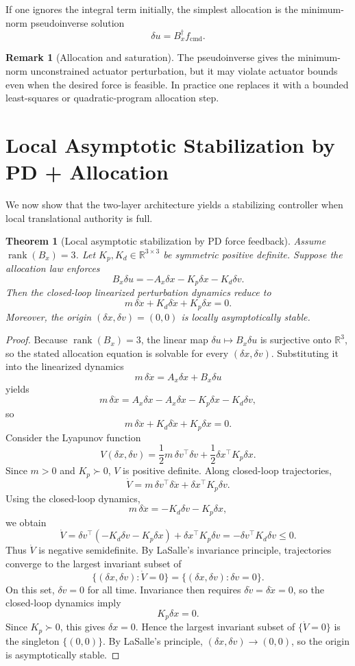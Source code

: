 \documentclass[11pt]{article}
\newtheorem{theorem}{Theorem}
\theoremstyle{definition}
\newtheorem{remark}{Remark}
\begin{document}
If one ignores the integral term initially, the simplest allocation is the minimum-norm pseudoinverse solution
\[
\delta u = B_x^\dagger f_{\mathrm{cmd}}.
\]

\begin{remark}[Allocation and saturation]
The pseudoinverse gives the minimum-norm unconstrained actuator perturbation, but it may violate actuator bounds even when the desired force is feasible. In practice one replaces it with a bounded least-squares or quadratic-program allocation step.
\end{remark}

\section{Local Asymptotic Stabilization by PD + Allocation}

We now show that the two-layer architecture yields a stabilizing controller when local translational authority is full.

\begin{theorem}[Local asymptotic stabilization by PD force feedback]
Assume $\operatorname{rank}(B_x)=3$. Let $K_p,K_d\in\mathbb{R}^{3\times 3}$ be symmetric positive definite. Suppose the allocation law enforces
\[
B_x\delta u = -A_x\delta x - K_p\delta x - K_d\delta v.
\]
Then the closed-loop linearized perturbation dynamics reduce to
\[
m\,\delta \ddot x + K_d\delta \dot x + K_p\delta x = 0.
\]
Moreover, the origin $(\delta x,\delta v)=(0,0)$ is locally asymptotically stable.
\end{theorem}

\begin{proof}
Because $\operatorname{rank}(B_x)=3$, the linear map $\delta u\mapsto B_x\delta u$ is surjective onto $\mathbb{R}^3$, so the stated allocation equation is solvable for every $(\delta x,\delta v)$. Substituting it into the linearized dynamics
\[
m\,\delta \ddot x = A_x\delta x + B_x\delta u
\]
yields
\[
m\,\delta \ddot x = A_x\delta x - A_x\delta x - K_p\delta x - K_d\delta v,
\]
so
\[
m\,\delta \ddot x + K_d\delta \dot x + K_p\delta x = 0.
\]
Consider the Lyapunov function
\[
V(\delta x,\delta v)=\frac12 m\,\delta v^\top\delta v + \frac12\delta x^\top K_p\delta x.
\]
Since $m>0$ and $K_p\succ 0$, $V$ is positive definite. Along closed-loop trajectories,
\[
\dot V = m\,\delta v^\top\delta \ddot x + \delta x^\top K_p\delta v.
\]
Using the closed-loop dynamics,
\[
m\,\delta \ddot x = -K_d\delta v - K_p\delta x,
\]
we obtain
\[
\dot V = \delta v^\top(-K_d\delta v - K_p\delta x) + \delta x^\top K_p\delta v = -\delta v^\top K_d\delta v \le 0.
\]
Thus $\dot V$ is negative semidefinite. By LaSalle's invariance principle, trajectories converge to the largest invariant subset of
\[
\{(\delta x,\delta v): \dot V=0\} = \{(\delta x,\delta v): \delta v=0\}.
\]
On this set, $\delta v=0$ for all time. Invariance then requires $\delta \dot v=\delta \ddot x=0$, so the closed-loop dynamics imply
\[
K_p\delta x=0.
\]
Since $K_p\succ 0$, this gives $\delta x=0$. Hence the largest invariant subset of $\{\dot V=0\}$ is the singleton $\{(0,0)\}$. By LaSalle's principle, $(\delta x,\delta v)\to (0,0)$, so the origin is asymptotically stable.
\end{proof}
\end{document}
